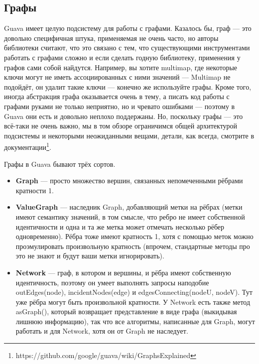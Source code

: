 \documentclass[a5paper,draft]{article}
\begin{document}
\subsection{Графы}

Guava имеет целую подсистему для работы с графами. Казалось бы, граф --- это довольно специфичная штука, применяемая не очень часто, но авторы библиотеки считают, что это связано с тем, что существующими инструментами работать с графами сложно и если сделать годную библиотеку, применения у графов сами собой найдутся. Например, вы хотите multimap, где некоторые ключи могут не иметь ассоциированных с ними значений --- Multimap не подойдёт, он удалит такие ключи --- конечно же используйте графы. Кроме того, иногда абстракция графа оказывается очень в тему, а писать код работы с графами руками не только неприятно, но и чревато ошибками --- поэтому в Guava они есть и довольно неплохо поддержаны. Но, поскольку графы --- это всё-таки не очень важно, мы в том обзоре ограничимся общей архитектурой подсистемы и некоторыми неожиданными вещами, детали, как всегда, смотрите в документации\footnote{https://github.com/google/guava/wiki/GraphsExplained}.

Графы в Guava бывают трёх сортов.
\begin{itemize}
	\item \textbf{Graph} --- просто множество вершин, связанных непомеченными рёбрами кратности 1.
	\item \textbf{ValueGraph} --- наследник Graph, добавляющий метки на рёбрах (метки имеют семантику значений, в том смысле, что ребро не имеет собственной идентичности и одна и та же метка может отмечать несколько рёбер одновременно). Рёбра тоже имеют кратность 1, хотя с помощью меток можно проэмулировать произвольную кратность (впрочем, стандартные методы про это не знают и будут ваши метки игнорировать).
	\item \textbf{Network} --- граф, в котором и вершины, и рёбра имеют собственную идентичность, поэтому он умеет выполнять запросы наподобие outEdges(node), incidentNodes(edge) и edgesConnecting(nodeU, nodeV). Тут уже рёбра могут быть произвольной кратности. У Network есть также метод asGraph(), который возвращает представление в виде графа (выкидывая лишнюю информацию), так что все алгоритмы, написанные для Graph, могут работать и для Network, хотя он от Graph не наследует.
\end{itemize}
\end{document}
